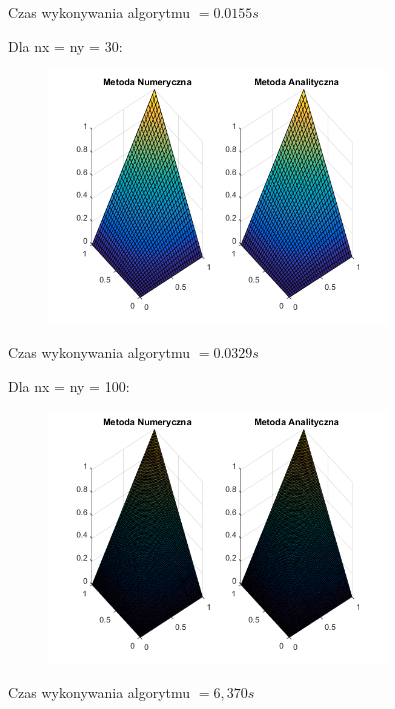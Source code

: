 Czas wykonywania algorytmu $ = 0.0155 s$

\newpage
Dla nx = ny = 30:

\begin{figure}[!ht]
	\begin{center}
		\includegraphics[width=0.8\textwidth]{Lab5/charts/zad1/30x30.png}
	\end{center}
\end{figure}

Czas wykonywania algorytmu $ = 0.0329 s$

Dla nx = ny = 100:

\begin{figure}[!ht]
	\begin{center}
		\includegraphics[width=0.8\textwidth]{Lab5/charts/zad1/100x100.png}
	\end{center}
\end{figure}

Czas wykonywania algorytmu $ = 6,370 s$

\newpage

